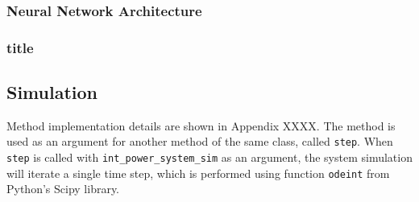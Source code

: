 \subsubsection{Neural Network Architecture}

\subsubsection{title}



\subsection{Simulation}
Method implementation details are shown in Appendix XXXX. The method is used as an argument for another method of the same class, called \verb|step|. When \verb|step| is called with \verb|int_power_system_sim| as an argument, the system simulation will iterate a single time step, which is performed using function \verb|odeint| from Python's Scipy library.